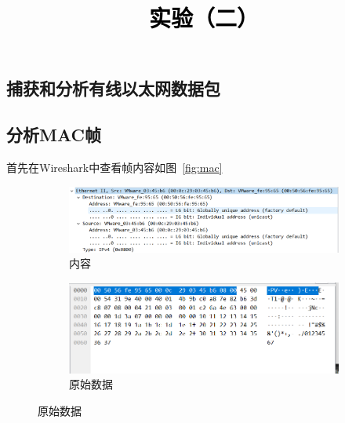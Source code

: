 \documentclass[a4paper,twoside]{article}
\newcommand{\PaperTitle}{实验（二）}  %
\begin{document}
\newpage

\title{
	\Large{\textcolor{black}{\PaperTitle}}
}
	
	
\maketitle
	
\tableofcontents
 
\newpage
\setcounter{page}{1}

\begin{spacing}{1.2}

\section{捕获和分析有线以太网数据包}

\subsection{分析MAC帧}

首先在Wireshark中查看帧内容如图~\ref{fig:mac}

\begin{figure}[htb]
	\centering
	\caption{MAC帧内容}
	\label{fig:mac}
	\begin{subfigure}{0.4\textwidth}
		\centering
		\includegraphics[width=\textwidth]{mac.png}
		\caption{内容}
		\label{fig:mac_det}
	\end{subfigure}
	\begin{subfigure}{0.4\textwidth}
		\centering
		\includegraphics[width=\textwidth]{mac_raw.png}
		\caption{原始数据}
		\label{fig:mac_raw}
	\end{subfigure}
\end{figure}


\end{spacing}
\end{document}
